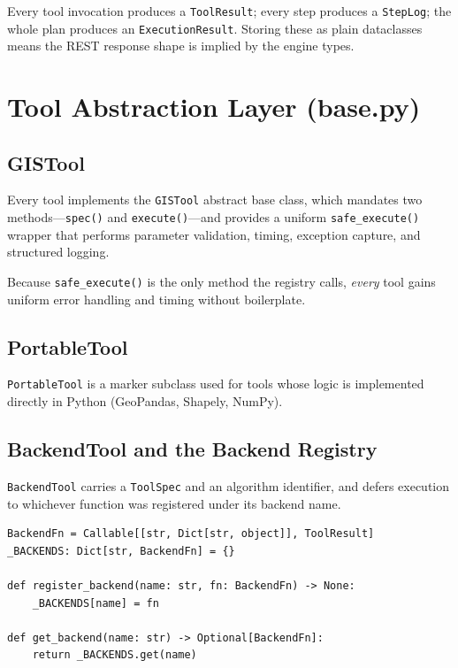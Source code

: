 \documentclass[12pt,a4paper]{report}
\begin{document}
Every tool invocation produces a \texttt{ToolResult}; every step produces a \texttt{StepLog}; the whole plan produces an \texttt{ExecutionResult}.  Storing these as plain dataclasses means the REST response shape is implied by the engine types.

\section{Tool Abstraction Layer (base.py)}

\subsection{GISTool}

Every tool implements the \texttt{GISTool} abstract base class, which mandates two methods---\texttt{spec()} and \texttt{execute()}---and provides a uniform \texttt{safe\_execute()} wrapper that performs parameter validation, timing, exception capture, and structured logging.

Because \texttt{safe\_execute()} is the only method the registry calls, \emph{every} tool gains uniform error handling and timing without boilerplate.

\subsection{PortableTool}

\texttt{PortableTool} is a marker subclass used for tools whose logic is implemented directly in Python (GeoPandas, Shapely, NumPy).

\subsection{BackendTool and the Backend Registry}

\texttt{BackendTool} carries a \texttt{ToolSpec} and an algorithm identifier, and defers execution to whichever function was registered under its backend name.

\begin{lstlisting}
BackendFn = Callable[[str, Dict[str, object]], ToolResult]
_BACKENDS: Dict[str, BackendFn] = {}

def register_backend(name: str, fn: BackendFn) -> None:
    _BACKENDS[name] = fn

def get_backend(name: str) -> Optional[BackendFn]:
    return _BACKENDS.get(name)
\end{lstlisting}
\end{document}
